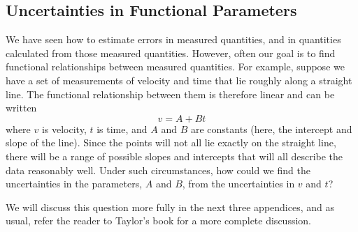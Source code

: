 \subsection*{Uncertainties in Functional Parameters}
     We have seen how to estimate errors in measured quantities,
and in quantities calculated from those measured quantities.
However, often our goal is to find functional
relationships between measured quantities.  For example, suppose we
have a set of measurements of velocity and time that lie roughly along
a straight line.  The functional relationship between them is
therefore linear and can be written
\[
v = A + Bt
\]
where $v$ is velocity, $t$ is time, and $A$ and $B$ are constants
(here, the intercept and slope of the line).  Since the points will
not all lie exactly on the straight line, there will be a range of
possible slopes and intercepts that will all describe the data
reasonably well.  Under such circumstances, how
could we find the uncertainties in the parameters, $A$ and $B$, from
the uncertainties in $v$ and $t$?

     We will discuss this question more fully in the next three
appendices, and as usual, refer the reader to Taylor's book for a more
complete discussion.



